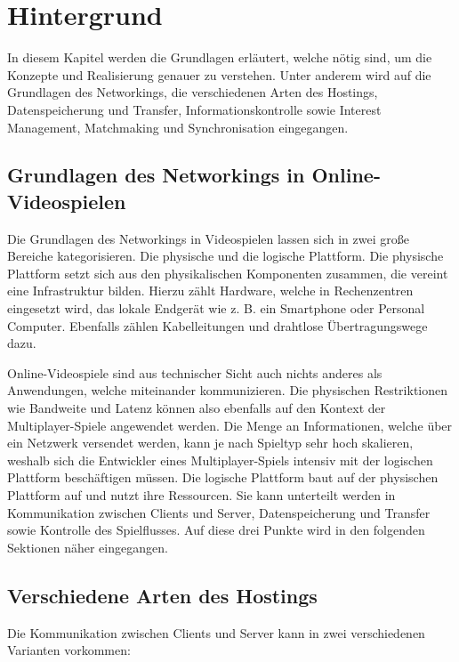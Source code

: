 
\chapter{Hintergrund}
\label{sec:hintergrund}

In diesem Kapitel werden die Grundlagen erläutert, welche nötig sind, um die Konzepte und Realisierung genauer zu verstehen. Unter anderem wird auf die Grundlagen des Networkings, die verschiedenen Arten des Hostings, Datenspeicherung und Transfer, Informationskontrolle sowie Interest Management, Matchmaking und Synchronisation eingegangen.

\section{Grundlagen des Networkings in Online-Videospielen}

Die Grundlagen des Networkings in Videospielen lassen sich in zwei große Bereiche kategorisieren. Die physische und die logische Plattform. Die physische Plattform setzt sich aus den physikalischen Komponenten zusammen, die vereint eine Infrastruktur bilden. Hierzu zählt Hardware, welche in Rechenzentren eingesetzt wird, das lokale Endgerät wie z. B. ein Smartphone oder Personal Computer. Ebenfalls zählen Kabelleitungen und drahtlose Übertragungswege dazu. 

Online-Videospiele sind aus technischer Sicht auch nichts anderes als Anwendungen, welche miteinander kommunizieren. Die physischen Restriktionen wie Bandweite und Latenz können also ebenfalls auf den Kontext der Multiplayer-Spiele angewendet werden. Die Menge an Informationen, welche über ein Netzwerk versendet werden, kann je nach Spieltyp sehr hoch skalieren, weshalb sich die Entwickler eines Multiplayer-Spiels intensiv mit der logischen Plattform beschäftigen müssen. Die logische Plattform baut auf der physischen Plattform auf und nutzt ihre Ressourcen. Sie kann unterteilt werden in Kommunikation zwischen Clients und Server, Datenspeicherung und Transfer sowie Kontrolle des Spielflusses. Auf diese drei Punkte wird in den folgenden Sektionen näher eingegangen. \cite{Smed.2002c}

\section{Verschiedene Arten des Hostings}
\label{arten_des_hostings}

Die Kommunikation zwischen Clients und Server kann in zwei verschiedenen Varianten vorkommen:


